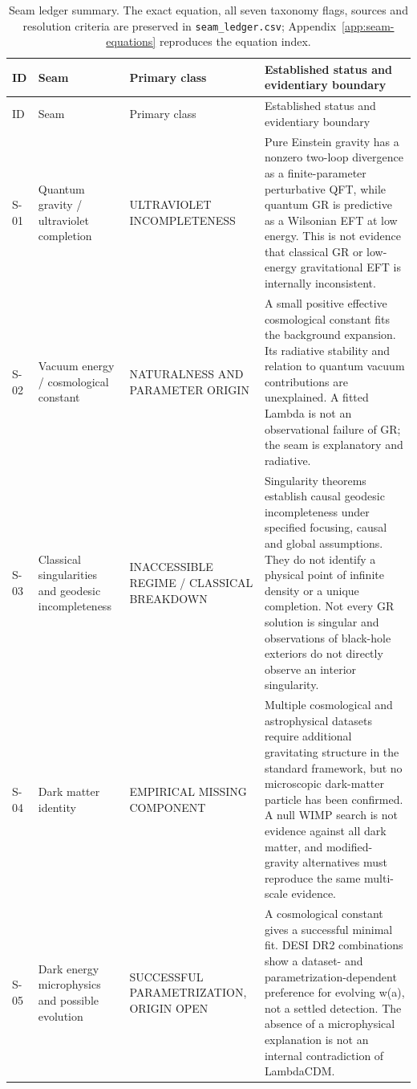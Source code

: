 \begingroup\small
\setlength\LTleft{0pt}\setlength\LTright{0pt}
\begin{longtable}{@{}p{0.7cm}p{2.35cm}p{2.55cm}p{7.4cm}@{}}
\caption{Seam ledger summary. The exact equation, all seven taxonomy flags, sources and resolution criteria are preserved in \texttt{seam\_ledger.csv}; Appendix~\ref{app:seam-equations} reproduces the equation index.}\label{tab:seams}\\
\toprule ID & Seam & Primary class & Established status and evidentiary boundary\\\midrule\endfirsthead
\toprule ID & Seam & Primary class & Established status and evidentiary boundary\\\midrule\endhead
S-01 & Quantum gravity / ultraviolet completion & ULTRAVIOLET INCOMPLETENESS & Pure Einstein gravity has a nonzero two-loop divergence as a finite-parameter perturbative QFT, while quantum GR is predictive as a Wilsonian EFT at low energy. This is not evidence that classical GR or low-energy gravitational EFT is internally inconsistent. \\
S-02 & Vacuum energy / cosmological constant & NATURALNESS AND PARAMETER ORIGIN & A small positive effective cosmological constant fits the background expansion. Its radiative stability and relation to quantum vacuum contributions are unexplained. A fitted Lambda is not an observational failure of GR; the seam is explanatory and radiative. \\
S-03 & Classical singularities and geodesic incompleteness & INACCESSIBLE REGIME / CLASSICAL BREAKDOWN & Singularity theorems establish causal geodesic incompleteness under specified focusing, causal and global assumptions. They do not identify a physical point of infinite density or a unique completion. Not every GR solution is singular and observations of black-hole exteriors do not directly observe an interior singularity. \\
S-04 & Dark matter identity & EMPIRICAL MISSING COMPONENT & Multiple cosmological and astrophysical datasets require additional gravitating structure in the standard framework, but no microscopic dark-matter particle has been confirmed. A null WIMP search is not evidence against all dark matter, and modified-gravity alternatives must reproduce the same multi-scale evidence. \\
S-05 & Dark energy microphysics and possible evolution & SUCCESSFUL PARAMETRIZATION, ORIGIN OPEN & A cosmological constant gives a successful minimal fit. DESI DR2 combinations show a dataset- and parametrization-dependent preference for evolving w(a), not a settled detection. The absence of a microphysical explanation is not an internal contradiction of LambdaCDM. \\

\end{longtable}
